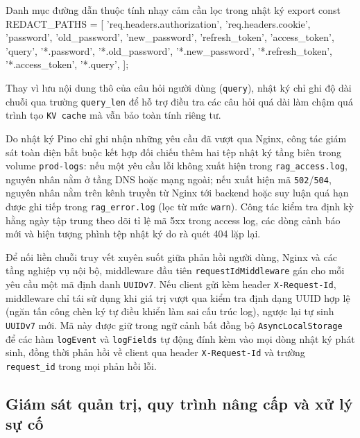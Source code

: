 \begin{tsbox}{Danh mục đường dẫn thuộc tính nhạy cảm cần lọc trong nhật ký}
export const REDACT_PATHS = [
  'req.headers.authorization',
  'req.headers.cookie',
  'password',
  'old_password',
  'new_password',
  'refresh_token',
  'access_token',
  'query',
  '*.password',
  '*.old_password',
  '*.new_password',
  '*.refresh_token',
  '*.access_token',
  '*.query',
];
\end{tsbox}

Thay vì lưu nội dung thô của câu hỏi người dùng (\texttt{query}), nhật ký chỉ ghi độ dài chuỗi qua trường \texttt{query\_\allowbreak{}len} để hỗ trợ điều tra các câu hỏi quá dài làm chậm quá trình tạo \texttt{KV cache} mà vẫn bảo toàn tính riêng tư.

Do nhật ký Pino chỉ ghi nhận những yêu cầu đã vượt qua Nginx, công tác giám sát toàn diện bắt buộc kết hợp đối chiếu thêm hai tệp nhật ký tầng biên trong volume \texttt{prod-\allowbreak{}logs}: nếu một yêu cầu lỗi không xuất hiện trong \texttt{rag\_\allowbreak{}access.\allowbreak{}log}, nguyên nhân nằm ở tầng DNS hoặc mạng ngoài; nếu xuất hiện mã \texttt{502}/\texttt{504}, nguyên nhân nằm trên kênh truyền từ Nginx tới backend hoặc suy luận quá hạn được ghi tiếp trong \texttt{rag\_\allowbreak{}error.\allowbreak{}log} (lọc từ mức \texttt{warn}). Công tác kiểm tra định kỳ hằng ngày tập trung theo dõi tỉ lệ mã 5xx trong access log, các dòng cảnh báo mới và hiện tượng phình tệp nhật ký do rà quét 404 lặp lại.

Để nối liền chuỗi truy vết xuyên suốt giữa phản hồi người dùng, Nginx và các tầng nghiệp vụ nội bộ, middleware đầu tiên \texttt{requestIdMiddleware} gán cho mỗi yêu cầu một mã định danh \texttt{UUIDv7}. Nếu client gửi kèm header \texttt{X-\allowbreak{}Request-\allowbreak{}Id}, middleware chỉ tái sử dụng khi giá trị vượt qua kiểm tra định dạng UUID hợp lệ (ngăn tấn công chèn ký tự điều khiển làm sai cấu trúc log), ngược lại tự sinh \texttt{UUIDv7} mới. Mã này được giữ trong ngữ cảnh bất đồng bộ \texttt{AsyncLocalStorage} để các hàm \texttt{logEvent} và \texttt{logFields} tự động đính kèm vào mọi dòng nhật ký phát sinh, đồng thời phản hồi về client qua header \texttt{X-\allowbreak{}Request-\allowbreak{}Id} và trường \texttt{request\_\allowbreak{}id} trong mọi phản hồi lỗi.

\subsection{Giám sát quản trị, quy trình nâng cấp và xử lý sự cố}
\label{subsec:giam-sat-va-su-co}

